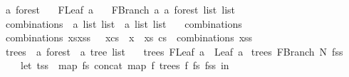 \begin{isabellebody}
\isadelimproof
%
\endisadelimproof
%
\isatagproof
%
\endisatagproof
{\isafoldproof}%
%
\isadelimproof
%
\endisadelimproof
%
\isadelimdocument
%
\endisadelimdocument
%
\isatagdocument
%
\isamarkuptrue%
%
\endisatagdocument
{\isafolddocument}%
%
\isadelimdocument
%
\endisadelimdocument
{}\isamarkupfalse%
\ {\isacharprime}{\kern0pt}a\ forest\ {\isacharequal}{\kern0pt}\isanewline
\ \ FLeaf\ {\isacharprime}{\kern0pt}a\isanewline
\ \ {\isacharbar}{\kern0pt}\ FBranch\ {\isacharprime}{\kern0pt}a\ {\isachardoublequoteopen}{\isacharprime}{\kern0pt}a\ forest\ list\ list{\isachardoublequoteclose}\isanewline
\isanewline
{}\isamarkupfalse%
\ combinations\ {\isacharcolon}{\kern0pt}{\isacharcolon}{\kern0pt}\ {\isachardoublequoteopen}{\isacharprime}{\kern0pt}a\ list\ list\ {\isasymRightarrow}\ {\isacharprime}{\kern0pt}a\ list\ list{\isachardoublequoteclose}\ \isanewline
\ \ {\isachardoublequoteopen}combinations\ {\isacharbrackleft}{\kern0pt}{\isacharbrackright}{\kern0pt}\ {\isacharequal}{\kern0pt}\ {\isacharbrackleft}{\kern0pt}{\isacharbrackleft}{\kern0pt}{\isacharbrackright}{\kern0pt}{\isacharbrackright}{\kern0pt}{\isachardoublequoteclose}\isanewline
{\isacharbar}{\kern0pt}\ {\isachardoublequoteopen}combinations\ {\isacharparenleft}{\kern0pt}xs{\isacharhash}{\kern0pt}xss{\isacharparenright}{\kern0pt}\ {\isacharequal}{\kern0pt}\ {\isacharbrackleft}{\kern0pt}\ x{\isacharhash}{\kern0pt}cs\ {\isachardot}{\kern0pt}\ x\ {\isacharless}{\kern0pt}{\isacharminus}{\kern0pt}\ xs{\isacharcomma}{\kern0pt}\ cs\ {\isacharless}{\kern0pt}{\isacharminus}{\kern0pt}\ combinations\ xss\ {\isacharbrackright}{\kern0pt}{\isachardoublequoteclose}\isanewline
\isanewline
{}\isamarkupfalse%
\ trees\ {\isacharcolon}{\kern0pt}{\isacharcolon}{\kern0pt}\ {\isachardoublequoteopen}{\isacharprime}{\kern0pt}a\ forest\ {\isasymRightarrow}\ {\isacharprime}{\kern0pt}a\ tree\ list{\isachardoublequoteclose}\ \isanewline
\ \ {\isachardoublequoteopen}trees\ {\isacharparenleft}{\kern0pt}FLeaf\ a{\isacharparenright}{\kern0pt}\ {\isacharequal}{\kern0pt}\ {\isacharbrackleft}{\kern0pt}Leaf\ a{\isacharbrackright}{\kern0pt}{\isachardoublequoteclose}\isanewline
{\isacharbar}{\kern0pt}\ {\isachardoublequoteopen}trees\ {\isacharparenleft}{\kern0pt}FBranch\ N\ fss{\isacharparenright}{\kern0pt}\ {\isacharequal}{\kern0pt}\ {\isacharparenleft}{\kern0pt}\isanewline
\ \ \ \ let\ tss\ {\isacharequal}{\kern0pt}\ {\isacharparenleft}{\kern0pt}map\ {\isacharparenleft}{\kern0pt}{\isasymlambda}fs{\isachardot}{\kern0pt}\ concat\ {\isacharparenleft}{\kern0pt}map\ {\isacharparenleft}{\kern0pt}{\isasymlambda}f{\isachardot}{\kern0pt}\ trees\ f{\isacharparenright}{\kern0pt}\ fs{\isacharparenright}{\kern0pt}{\isacharparenright}{\kern0pt}\ fss{\isacharparenright}{\kern0pt}\ in\isanewline

\end{isabellebody}
